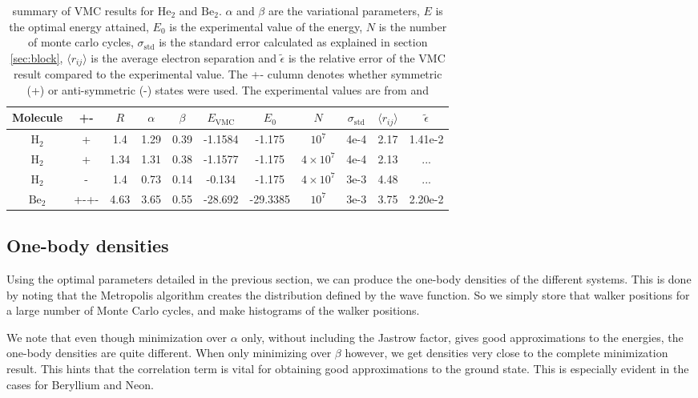 \documentclass[aps,prc,twocolumn,floatfix]{revtex4}
\begin{document}
\begin{widetext}
\begin{table}
\centering
 \begin{tabular}{|ccccccccccc|}
  \hline
  Molecule & +- & $R$ & $\alpha$ & $\beta$ & $E_{\text{VMC}}$& $E_0$ & $N$ & $\sigma_\text{std}$ & $\langle r_{ij} \rangle$ & $\tilde{\epsilon}$ \\
  \hline 
  $\text{H}_2$ & + & 1.4 & 1.29 & 0.39 & -1.1584 & -1.175 & $10^7$ & 4e-4 & 2.17 & 1.41e-2\\
  $\text{H}_2$ & + & 1.34 & 1.31 & 0.38 & -1.1577 & -1.175 & $4\times10^7$ & 4e-4 & 2.13 & ...\\
  $\text{H}_2$ & - & 1.4 & 0.73 & 0.14 & -0.134 & -1.175 & $4\times10^7$ & 3e-3 & 4.48 & ...\\
  $\text{Be}_2$ & +-+- & 4.63 & 3.65 & 0.55 & -28.692 & -29.3385 & $10^7$ & 3e-3 & 3.75 & 2.20e-2 \\
  \hline
 \end{tabular}

 \caption{summary of VMC results for $\text{He}_2$ and $\text{Be}_2$. $\alpha$ and $\beta$ are the variational parameters, $E$ is the optimal energy attained, $E_0$ is the experimental value of the energy, $N$ is the number of monte carlo cycles,   $\sigma_{\text{std}}$ is the standard error calculated as explained in section \ref{sec:block}, $\langle r_{ij} \rangle$ is the average electron separation and $\tilde{\epsilon}$ is the relative error of the VMC result compared to the experimental value. The +- culumn denotes whether symmetric (+) or anti-symmetric (-) states were used. The experimental values are from \cite{moskowitz81} and \cite{filippi96}}
 \label{tab:4}
\end{table}
 \end{widetext}

\clearpage
\subsection{One-body densities}
Using the optimal parameters detailed in the previous section, we can produce the one-body densities of the different systems. This is done by noting that the Metropolis algorithm creates the distribution defined by the wave function. So we simply store that walker positions for a large number of Monte Carlo cycles, and make histograms of the walker positions.

We note that even though minimization over $\alpha$ only, without including the Jastrow factor, gives good approximations to the energies, the one-body densities are quite different. When only minimizing over $\beta$ however, we get densities very close to the complete minimization result. This hints that the correlation term is vital for obtaining good approximations to the ground state. This is especially evident in the cases for Beryllium and Neon.
\end{document}
